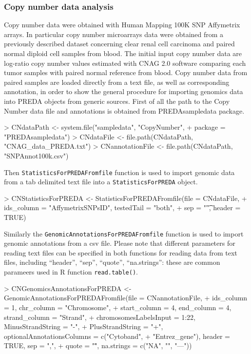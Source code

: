 \documentclass[a4paper,10pt]{article}
\begin{document}
\subsubsection{Copy number data analysis}
Copy number data were obtained with Human Mapping 100K SNP Affymetrix arrays. In particular copy number microarrays data were obtained from a previously described dataset \cite{PubMed_19542187} concerning clear renal cell carcinoma and paired normal diploid cell samples from blood. The initial input copy number data are log-ratio copy number values estimated with CNAG 2.0 software \cite{PubMed_16024607} comparing each tumor samples with paired normal reference from blood.
Copy number data from paired samples are loaded directly from a text file, as well as corresponding annotation, in order to show the general procedure for importing genomics data into PREDA objects from generic sources. First of all the path to the Copy Number data file and annotations is obtained from PREDAsampledata package.

\begin{Schunk}
\begin{Sinput}
> CNdataPath <- system.file("sampledata", "CopyNumber", 
+     package = "PREDAsampledata")
> CNdataFile <- file.path(CNdataPath, "CNAG_data_PREDA.txt")
> CNannotationFile <- file.path(CNdataPath, "SNPAnnot100k.csv")
\end{Sinput}
\end{Schunk}


Then \texttt{StatisticsForPREDAFromfile} function is used to import genomic data from a tab delimited text file into a \texttt{StatisticsForPREDA} object.

\begin{Schunk}
\begin{Sinput}
> CNStatisticsForPREDA <- StatisticsForPREDAFromfile(file = CNdataFile, 
+     ids_column = "AffymetrixSNPsID", testedTail = "both", 
+     sep = "\t", header = TRUE)
\end{Sinput}
\end{Schunk}

Similarly the \texttt{GenomicAnnotationsForPREDAFromfile} function is used to import genomic annotations from a csv file. Please note that different parameters for reading text files can be specified in both functions for reading data from text files, including ``header'', ``sep'', ``quote'', ``na.strings'': these are common parameers used in R function \texttt{read.table()}.

\begin{Schunk}
\begin{Sinput}
> CNGenomicsAnnotationsForPREDA <- GenomicAnnotationsForPREDAFromfile(file = CNannotationFile, 
+     ids_column = 1, chr_column = "Chromosome", 
+     start_column = 4, end_column = 4, strand_column = "Strand", 
+     chromosomesLabelsInput = 1:22, MinusStrandString = "-", 
+     PlusStrandString = "+", optionalAnnotationsColumns = c("Cytoband", 
+         "Entrez_gene"), header = TRUE, sep = ",", 
+     quote = "\"", na.strings = c("NA", "", "---"))
\end{Sinput}
\end{Schunk}
\end{document}
